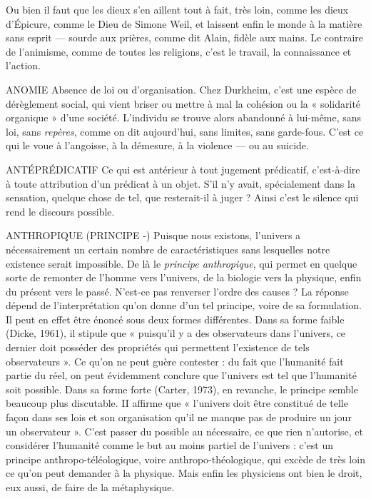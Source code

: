 Ou bien il faut que les dieux s’en aillent tout à fait, très loin, comme les
dieux d’Épicure, comme le Dieu de Simone Weil, et laissent enfin le monde à
la matière sans esprit — sourde aux prières, comme dit Alain, fidèle aux mains.
Le contraire de l’animisme, comme de toutes les religions, c’est le travail, la
connaissance et l’action.

ANOMIE Absence de loi ou d'organisation. Chez Durkheim, c’est une espèce
de dérèglement social, qui vient briser ou mettre à mal la cohésion
ou la « solidarité organique » d’une société. L’individu se trouve alors abandonné
à lui-même, sans loi, sans {\it repères}, comme on dit aujourd’hui, sans
limites, sans garde-fous. C’est ce qui le voue à l’angoisse, à la démesure, à la violence —
ou au suicide.

ANTÉPRÉDICATIF Ce qui est antérieur à tout jugement prédicatif, c’est-à-dire
à toute attribution d’un prédicat à un objet. S'il
n’y avait, spécialement dans la sensation, quelque chose de tel, que resterait-il à
juger ? Ainsi c’est le silence qui rend le discours possible.

ANTHROPIQUE (PRINCIPE -) Puisque nous existons, l'univers a nécessairement
un certain nombre de caractéristiques
sans lesquelles notre existence serait impossible. De là le {\it principe anthropique},
qui permet en quelque sorte de remonter de l’homme vers l'univers, de
la biologie vers la physique, enfin du présent vers le passé. N'est-ce pas renverser
l’ordre des causes ? La réponse dépend de l'interprétation qu’on donne
d’un tel principe, voire de sa formulation. Il peut en effet être énoncé sous deux
formes différentes. Dans sa forme faible (Dicke, 1961), il stipule que « puisqu’il
y a des observateurs dans l’univers, ce dernier doit posséder des propriétés
qui permettent l'existence de tels observateurs ». Ce qu'on ne peut guère
contester : du fait que l'humanité fait partie du réel, on peut évidemment
conclure que l’univers est tel que l'humanité soit possible. Dans sa forme forte
(Carter, 1973), en revanche, le principe semble beaucoup plus discutable. II
affirme que « l'univers doit être constitué de telle façon dans ses lois et son
organisation qu’il ne manque pas de produire un jour un observateur ». C’est
passer du possible au nécessaire, ce que rien n’autorise, et considérer l'humanité
comme le but au moins partiel de l’univers : c’est un principe anthropo-téléologique,
voire anthropo-théologique, qui excède de très loin ce qu’on peut
demander à la physique. Mais enfin les physiciens ont bien le droit, eux aussi,
de faire de la métaphysique.

